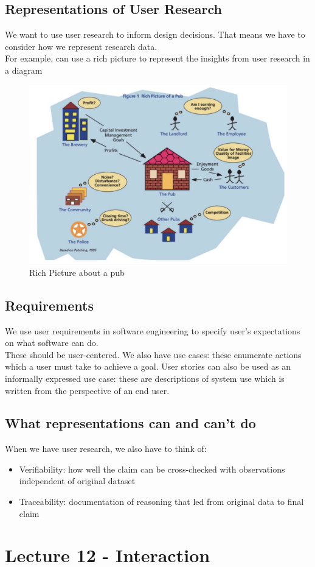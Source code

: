 \documentclass{article}
\begin{document}
\subsection{Representations of User Research}
We want to use user research to inform design decisions. That means we have to consider how we represent research data. \\
For example, can use a rich picture to represent the insights from user research in a diagram
\begin{figure}
    \centering
    \includegraphics[width=0.5\linewidth]{Pictures/Screenshot 2023-02-26 at 18.55.31.png}
    \caption{Rich Picture about a pub}
\end{figure}
\subsection{Requirements}
We use user requirements in software engineering to specify user's expectations on what software can do. \\
These should be user-centered. We also have use cases: these enumerate actions which a user must take to achieve a goal. User stories can also be used as an informally expressed use case: these are descriptions of system use which is written from the perspective of an end user. 
\subsection{What representations can and can't do}
When we have user research, we also have to think of:
\begin{itemize}
    \item Verifiability: how well the claim can be cross-checked with observations independent of original dataset
    \item Traceability: documentation of reasoning that led from original data to final claim
\end{itemize}
\section{Lecture 12 - Interaction}
\end{document}
